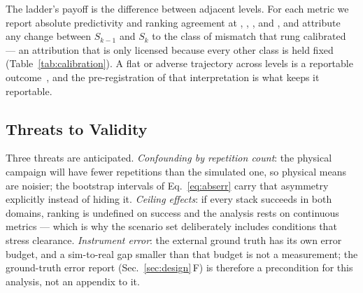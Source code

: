 The ladder's payoff is the difference between adjacent levels. For each
metric we report absolute predictivity and ranking agreement at \SZERO{},
\SONE{}, \STWO{}, and \STHREE{}, and attribute any change between $S_{k-1}$
and $S_k$ to the class of mismatch that rung calibrated --- an attribution
that is only licensed because every other class is held fixed
(Table~\ref{tab:calibration}). A flat or adverse trajectory across levels is
a reportable outcome~\cite{truong2022rethinki}, and the pre-registration of
that interpretation is what keeps it reportable.

\subsection{Threats to Validity}

Three threats are anticipated. \emph{Confounding by repetition count}: the
physical campaign will have fewer repetitions than the simulated one, so
physical means are noisier; the bootstrap intervals of
Eq.~\eqref{eq:abserr} carry that asymmetry explicitly instead of hiding it.
\emph{Ceiling effects}: if every stack succeeds in both domains, ranking is
undefined on success and the analysis rests on continuous metrics ---
which is why the scenario set deliberately includes conditions that stress
clearance. \emph{Instrument error}: the external ground truth has its own
error budget, and a sim-to-real gap smaller than that budget is not a
measurement; the ground-truth error report (Sec.~\ref{sec:design}\,F) is
therefore a precondition for this analysis, not an appendix to it.

\SREAL
